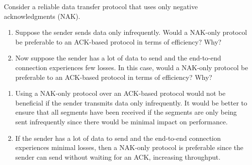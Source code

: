 \documentclass{report}
\begin{document}
\newpage
\begin{problem}

Consider a reliable data transfer protocol that uses only negative acknowledgments (NAK). 
\begin{enumerate}
    \item Suppose the sender sends data only infrequently. Would a NAK-only protocol be preferable to an ACK-based protocol in terms of efficiency? Why?
    \item  Now suppose the sender has a lot of data to send and the end-to-end connection experiences few losses. In this case, would a NAK-only protocol be preferable to an ACK-based protocol in terms of efficiency? Why?
\end{enumerate}
\medskip
\begin{answer}{50em}
\begin{enumerate}
    \item Using a NAK-only protocol over an ACK-based protocol would not be beneficial if the sender transmits
        data only infrequently. It would be better to ensure that all segments have been received 
        if the segments are only being sent infrequently since there would be minimal impact on performance.
    \item If the sender has a lot of data to send and the end-to-end connection experiences minimal losses,
        then a NAK-only protocol is preferable since the sender can send without waiting for an ACK,
        increasing throughput.
\end{enumerate}
\end{answer}

\end{problem}
\end{document}
